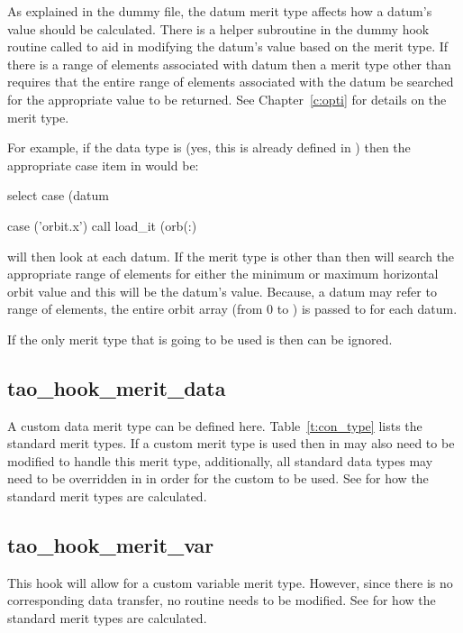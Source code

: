 As explained in the dummy file, the datum merit type affects how a
datum's value should be calculated. There is a helper subroutine in
the dummy hook routine called  to aid in modifying the
datum's value based on the merit type. If there is a range of elements
associated with datum then a merit type other than 
requires that the entire range of elements associated with the datum
be searched for the appropriate value to be returned.  See
Chapter~\ref{c:opti} for details on the merit type.

For example, if the data type is  (yes, this is already
defined in \tao) then the appropriate case item in
 would be:
\begin{example}
select case (datum%

case ('orbit.x')
  call load_it (orb(:)%
\end{example}
 will then look at each datum. If the merit type is other
than  then  will search the appropriate range
of elements for either the minimum or maximum horizontal orbit value
and this will be the datum's value. Because, a datum may refer to
range of elements, the entire orbit array (from 0 to )
is passed to  for each  datum.

If the only merit type that is going to be used is  then
 can be ignored.

\subsection{tao\_hook\_merit\_data}

A custom data merit type can be defined here. Table~\ref{t:con_type}
lists the standard merit types. If a custom merit type is used then
 in  may also need to be
modified to handle this merit type, additionally, all standard data
types may need to be overridden in  in
order for the custom  to be used.  See
 for how the standard merit types are
calculated.

\subsection{tao\_hook\_merit\_var}

This hook will allow for a custom variable merit type. However, since
there is no corresponding data transfer, no  routine needs
to be modified.  See  for how the standard
merit types are calculated.

